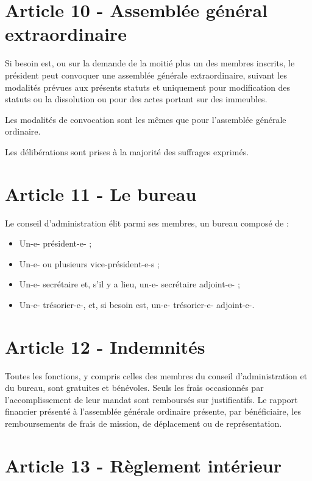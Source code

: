 \documentclass[a4paper,oneside,10pt]{article}
\begin{document}
\section*{Article 10 - Assemblée général extraordinaire}

Si besoin est, ou sur la demande de la moitié plus un des membres inscrits, le président peut convoquer une assemblée générale extraordinaire, suivant les modalités prévues aux présents statuts et uniquement pour modification des statuts ou la dissolution ou pour des actes portant sur des immeubles.


Les modalités de convocation sont les mêmes que pour l'assemblée générale ordinaire.


Les délibérations sont prises à la majorité des suffrages exprimés.


\section*{Article 11 - Le bureau}

Le conseil d'administration élit parmi ses membres, un bureau composé de :

\begin{itemize}
\item Un-e- président-e- ;
\item Un-e- ou plusieurs vice-président-e-s ;
\item Un-e- secrétaire et, s'il y a lieu, un-e- secrétaire adjoint-e- ;
\item Un-e- trésorier-e-, et, si besoin est, un-e- trésorier-e- adjoint-e-.
\end{itemize}

\section*{Article 12 - Indemnités}

Toutes les fonctions, y compris celles des membres du conseil d'administration et du bureau, sont gratuites et bénévoles. Seuls les frais occasionnés par l'accomplissement de leur mandat sont remboursés sur justificatifs. Le rapport financier présenté à l'assemblée générale ordinaire présente, par bénéficiaire, les remboursements de frais de mission, de déplacement ou de représentation.

\section*{Article 13 - Règlement intérieur}
\end{document}
